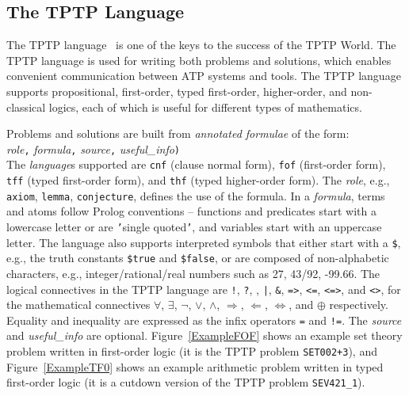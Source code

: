 \documentclass[runningheads]{llncs}
\newcommand{\smalltt}[1]{\small \texttt{#1}}
\begin{document}
\subsection{The TPTP Language}
\label{Languages}

The TPTP language~\cite{Sut23-IGPL} is one of the keys to the success of the TPTP World.
The TPTP language is used for writing both problems and solutions,
which enables convenient communication between ATP systems and tools.
The TPTP language supports propositional, first-order, typed first-order, higher-order, and
non-classical logics, each of which is useful for different types of mathematics.

Problems and solutions are built from {\em annotated formulae} of the form: \\
{\em role}{\tt ,}
{\em formula}{\tt ,}
{\em source}{\tt ,}
{\em useful\_info}{\tt )}\\
The {\em language}s supported are {\smalltt{cnf}} (clause normal form), {\smalltt{fof}}
(first-order form), {\smalltt{tff}} (typed first-order form), and {\smalltt{thf}}
(typed higher-order form).
The {\em role}, e.g., {\smalltt{axiom}}, {\smalltt{lemma}}, {\smalltt{conjecture}}, defines the 
use of the formula.
In a {\em formula}, terms and atoms follow Prolog conventions -- functions and predicates start 
with a lowercase letter or are {\tt '}single quoted{\tt '}, and variables start with an uppercase 
letter.
The language also supports interpreted symbols that either start with a {\tt \$}, e.g., the 
truth constants {\smalltt{\$true}} and {\smalltt{\$false}}, or are composed of 
non-alphabetic characters, e.g., integer/rational/real numbers such as 27, 43/92, -99.66.
The logical connectives in the TPTP language are
{\tt !}, {\tt ?}, {\tt {\raisebox{0.4ex}{\texttildelow}}}, {\tt |}, {\tt \&}, {\tt =>}, {\tt <=},
{\tt <=>}, and {\tt <{\raisebox{0.4ex}{\texttildelow}}>},
for the mathematical connectives
$\forall$, $\exists$, $\neg$, $\vee$, $\wedge$, $\Rightarrow$, $\Leftarrow$, $\Leftrightarrow$, 
and $\oplus$ respectively.
Equality and inequality are expressed as the infix operators {\tt =} and {\tt !=}.
The {\em source} and {\em useful\_info} are optional.
Figure~\ref{ExampleFOF} shows an example set theory problem written in first-order logic
(it is the TPTP problem {\tt SET002+3}), and Figure~\ref{ExampleTF0} shows an example
arithmetic problem written in typed first-order logic (it is a cutdown version of the TPTP 
problem {\tt SEV421\_1}).
\end{document}
